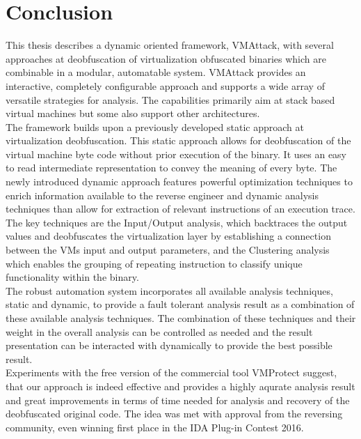 \documentclass[10pt,twoside,a4paper,bibliography=totoc]{scrbook}
\begin{document}
\section{Conclusion}
This thesis describes a dynamic oriented framework, VMAttack, with several approaches at deobfuscation of virtualization obfuscated binaries which are combinable in a modular, automatable system. 
VMAttack provides an interactive, completely configurable approach and supports a wide array of versatile strategies for analysis. The capabilities primarily aim at stack based virtual machines but some also support other architectures. \\
The framework builds upon a previously developed static approach at virtualization deobfuscation. This static approach allows for deobfuscation of the virtual machine byte code without prior execution of the binary. It uses an easy to read intermediate representation to convey the meaning of every byte.
The newly introduced dynamic approach features powerful optimization techniques to enrich information available to the reverse engineer and dynamic analysis techniques than allow for extraction of relevant instructions of an execution trace. 
The key techniques are the Input/Output analysis, which backtraces the output values and deobfuscates the virtualization layer by establishing a connection between the VMs input and output parameters, and the Clustering analysis which enables the grouping of repeating instruction to classify unique functionality within the binary. \\
The robust automation system incorporates all available analysis techniques, static and dynamic, to provide a fault tolerant analysis result as a combination of these available analysis techniques. 
The combination of these techniques and their weight in the overall analysis can be controlled as needed and the result presentation can be interacted with dynamically to provide the best possible result.\\
Experiments with the free version of the commercial tool VMProtect suggest, that our approach is indeed effective and provides a highly aqurate analysis result and great improvements in terms of time needed for analysis and recovery of the deobfuscated original code.
The idea was met with approval from the reversing community, even winning first place in the IDA Plug-in Contest 2016.


\fancyhead[RE]{\rightmark}




\end{document}
